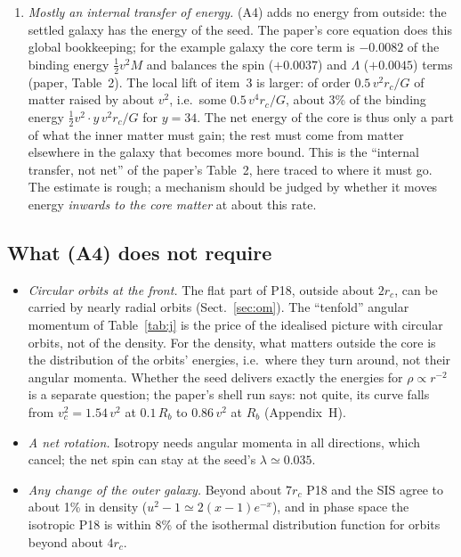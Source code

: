\documentclass[11pt,a4paper]{article}
\newcommand{\rc}{r_c}
\newcommand{\Rb}{R_b}
\begin{document}
\begin{enumerate}
\item \emph{Mostly an internal transfer of energy.} (A4) adds no energy from
  outside: the settled galaxy has the energy of the seed. The paper's core equation
  does this global bookkeeping; for the example galaxy the core term is $-0.0082$ of
  the binding energy $\tfrac12v^2M$ and balances the spin ($+0.0037$) and $\Lambda$
  ($+0.0045$) terms (paper, Table~2). The local lift of item~3 is larger: of order
  $0.5\,v^2\rc/G$ of matter raised by about $v^2$, i.e.\ some $0.5\,v^4\rc/G$, about
  3\% of the binding energy $\tfrac12v^2\cdot y\,v^2\rc/G$ for $y=34$. The net
  energy of the core is thus only a part of what the inner matter must gain; the rest
  must come from matter elsewhere in the galaxy that becomes more bound. This is the
  ``internal transfer, not net'' of the paper's Table~2, here traced to where it
  must go. The estimate is rough; a mechanism should be judged by whether it moves
  energy \emph{inwards to the core matter} at about this rate.
\end{enumerate}

\subsection{What (A4) does not require}
\begin{itemize}
\item \emph{Circular orbits at the front.} The flat part of P18, outside about
  $2\rc$, can be carried by nearly radial orbits (Sect.~\ref{sec:om}). The
  ``tenfold'' angular momentum of Table~\ref{tab:j} is the price of the idealised
  picture with circular orbits, not of the density. For the density, what matters
  outside the core is the distribution of the orbits' energies, i.e.\ where they turn
  around, not their angular momenta. Whether the seed delivers exactly the energies
  for $\rho\propto r^{-2}$ is a separate question; the paper's shell run says: not
  quite, its curve falls from $v_c^2=1.54\,v^2$ at $0.1\,\Rb$ to $0.86\,v^2$ at
  $\Rb$ (Appendix~H).
\item \emph{A net rotation.} Isotropy needs angular momenta in all directions, which
  cancel; the net spin can stay at the seed's $\lambda\simeq0.035$.
\item \emph{Any change of the outer galaxy.} Beyond about $7\rc$ P18 and the SIS
  agree to about 1\% in density ($u^2-1\simeq2(x-1)e^{-x}$), and in phase space the
  isotropic P18 is within 8\% of the isothermal distribution function for orbits
  beyond about $4\rc$.
\end{itemize}
\end{document}

